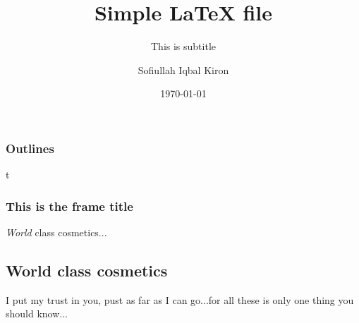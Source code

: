 \documentclass[11 pt]{beamer}
\title{Simple \LaTeX{} file}
\author{Sofiullah Iqbal Kiron}
\date{\today}
\subtitle{This is subtitle}
\institute{BSMRSTU}
\begin{document}
\begin{frame}
 \frametitle{Outlines}
\end{frame}

\begin{frame}
 \titlepage
\end{frame}

\begin{frame}{t}
 \frametitle{This is the frame title}
 \textit{World} class cosmetics...
 \\
 \subsection{World class cosmetics}
  I put my trust in you, pust as far as I can go...for all these is only one thing you should know...
\end{frame}
\end{document}
